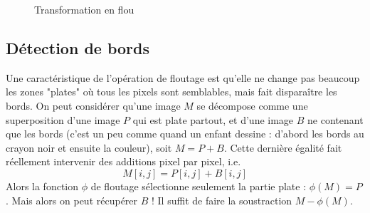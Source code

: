 \begin{figure}[h!]
    \centering
    \caption{Transformation en flou}
\end{figure}

\subsection*{Détection de bords}

Une caractéristique de l'opération de floutage est qu'elle ne change pas beaucoup les zones "plates" où tous les pixels sont semblables, mais fait disparaître les bords. On peut considérer qu'une image $ M $ se décompose comme une superposition d'une image $ P $ qui est plate partout, et d'une image $ B $ ne contenant que les bords (c'est un peu comme quand un enfant dessine : d'abord les bords au crayon noir et ensuite la couleur), soit $ M = P + B $. Cette dernière égalité fait réellement intervenir des additions pixel par pixel, i.e. \[
    M[i, j] = P[i, j] + B[i, j]
\]
Alors la fonction $ \phi $ de floutage sélectionne seulement la partie plate : $ \phi(M) = P $. Mais alors on peut récupérer $ B $ ! Il suffit de faire la soustraction $ M - \phi(M) $.

